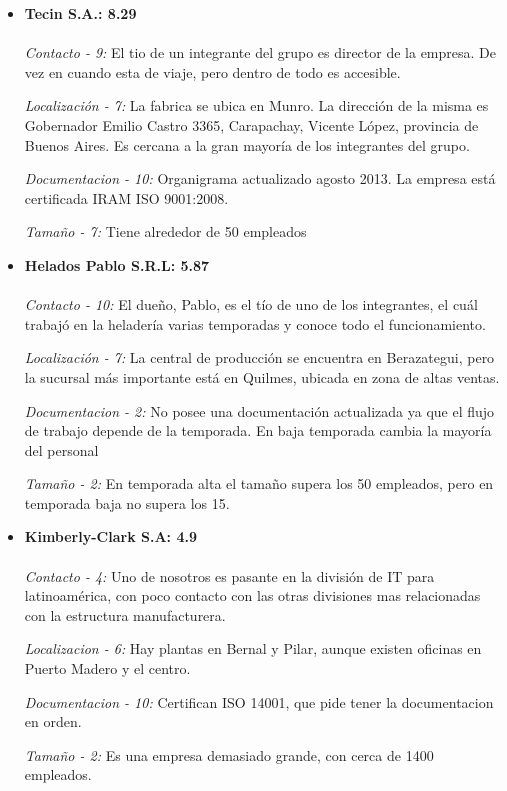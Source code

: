 \documentclass[a4paper,10pt]{article}
\begin{document}
\begin{itemize}

\item \textbf{Tecin S.A.: 8.29}\\
\\
\textit{Contacto - 9:}
El tio de un integrante del grupo es director de la empresa. De vez en cuando esta de viaje, pero dentro de todo es accesible.

\textit{Localización - 7:}
La fabrica se ubica en Munro. La dirección de la misma es Gobernador Emilio Castro 3365, Carapachay, Vicente López, provincia de Buenos Aires. Es cercana a la gran mayoría de los integrantes del grupo.

\textit{Documentacion - 10:}
Organigrama actualizado agosto 2013. La empresa está certificada IRAM ISO 9001:2008.

\textit{Tamaño - 7:}
Tiene alrededor de 50 empleados

\item \textbf{Helados Pablo S.R.L: 5.87} \\
\\
\textit{Contacto - 10:}
El dueño, Pablo, es el tío de uno de los integrantes, el cuál trabajó en la heladería varias temporadas y conoce todo el funcionamiento.

\textit{Localización - 7:}
La central de producción se encuentra en Berazategui, pero la sucursal más importante está en Quilmes, ubicada en zona de altas ventas.

\textit{Documentacion - 2:}
No posee una documentación actualizada ya que el flujo de trabajo depende de la temporada. En baja temporada cambia la mayoría del personal

\textit{Tamaño - 2:}
En temporada alta el tamaño supera los 50 empleados, pero en temporada baja no supera los 15.

\item \textbf{Kimberly-Clark S.A: 4.9} \\
\\
\textit{Contacto - 4:}
Uno de nosotros es pasante en la división de IT para latinoamérica, con poco contacto con las otras divisiones mas relacionadas con la estructura manufacturera.

\textit{Localizacion - 6:}
Hay plantas en Bernal y Pilar, aunque existen oficinas en Puerto Madero y el centro.

\textit{Documentacion - 10:}
Certifican ISO 14001, que pide tener la documentacion en orden.

\textit{Tamaño - 2:}
Es una empresa demasiado grande, con cerca de 1400 empleados.



\end{itemize}
\end{document}
